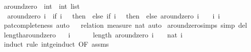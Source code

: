 \begin{isabellebody}
\isanewline
{}\isamarkupfalse%
\ around{\isacharunderscore}{\kern0pt}zero\ {\isacharcolon}{\kern0pt}{\isacharcolon}{\kern0pt}\ {\isachardoublequoteopen}int\ {\isasymRightarrow}\ int\ list{\isachardoublequoteclose}\isanewline
{}\isanewline
\ \ {\isachardoublequoteopen}around{\isacharunderscore}{\kern0pt}zero\ i\ {\isacharequal}{\kern0pt}\ {\isacharparenleft}{\kern0pt}if\ i\ {\isacharless}{\kern0pt}\ {}\ then\ {\isacharbrackleft}{\kern0pt}{\isacharbrackright}{\kern0pt}\ else\ {\isacharparenleft}{\kern0pt}if\ i\ {\isacharequal}{\kern0pt}\ {}\ then\ {\isacharbrackleft}{\kern0pt}{}{\isacharbrackright}{\kern0pt}\ else\ around{\isacharunderscore}{\kern0pt}zero\ {\isacharparenleft}{\kern0pt}i\ {\isacharminus}{\kern0pt}\ {}{\isacharparenright}{\kern0pt}\ {\isacharat}{\kern0pt}\ {\isacharbrackleft}{\kern0pt}i{\isacharcomma}{\kern0pt}\ {\isacharminus}{\kern0pt}i{\isacharbrackright}{\kern0pt}{\isacharparenright}{\kern0pt}{\isacharparenright}{\kern0pt}{\isachardoublequoteclose}\isanewline
%
\isadelimproof
\ \ %
\endisadelimproof
%
\isatagproof
{}\isamarkupfalse%
\ pat{\isacharunderscore}{\kern0pt}completeness\ auto%
\endisatagproof
{\isafoldproof}%
%
\isadelimproof
\isanewline
%
\endisadelimproof
{}\isamarkupfalse%
%
\isadelimproof
\ %
\endisadelimproof
%
\isatagproof
{}\isamarkupfalse%
\ {\isacharparenleft}{\kern0pt}relation\ {\isachardoublequoteopen}measure\ nat{\isachardoublequoteclose}{\isacharparenright}{\kern0pt}\ auto%
\endisatagproof
{\isafoldproof}%
%
\isadelimproof
%
\endisadelimproof
\isanewline
\isanewline
{}\isamarkupfalse%
\ around{\isacharunderscore}{\kern0pt}zero{\isachardot}{\kern0pt}simps\ {\isacharbrackleft}{\kern0pt}simp\ del{\isacharbrackright}{\kern0pt}\isanewline
\isanewline
{}\isamarkupfalse%
\ length{\isacharunderscore}{\kern0pt}around{\isacharunderscore}{\kern0pt}zero{\isacharcolon}{\kern0pt}\isanewline
\ \ \ {\isachardoublequoteopen}i\ {\isachargreater}{\kern0pt}{\isacharequal}{\kern0pt}\ {}{\isachardoublequoteclose}\ \isanewline
\ \ \ {\isachardoublequoteopen}length\ {\isacharparenleft}{\kern0pt}around{\isacharunderscore}{\kern0pt}zero\ i{\isacharparenright}{\kern0pt}\ {\isacharequal}{\kern0pt}\ {}\ {\isacharasterisk}{\kern0pt}\ nat\ i\ {\isacharplus}{\kern0pt}\ {}{\isachardoublequoteclose}\isanewline
%
\isadelimproof
%
\endisadelimproof
%
\isatagproof
{}\isamarkupfalse%
\ {\isacharparenleft}{\kern0pt}induct\ rule{\isacharcolon}{\kern0pt}\ int{\isacharunderscore}{\kern0pt}ge{\isacharunderscore}{\kern0pt}induct\ {\isacharbrackleft}{\kern0pt}OF\ assms{\isacharbrackright}{\kern0pt}{\isacharparenright}{\kern0pt}\isanewline

\end{isabellebody}
